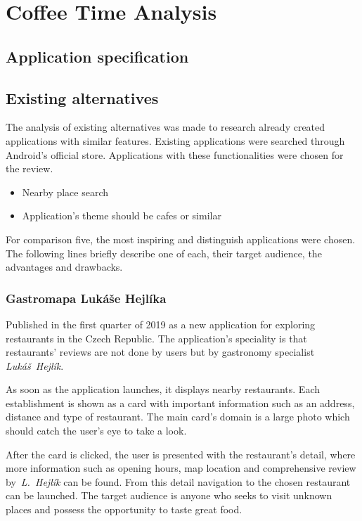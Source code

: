 \chapter{Coffee Time Analysis}


\section{Application specification}


\section{Existing alternatives}
The analysis of existing alternatives was made to research already created applications with similar features. Existing applications were searched through Android's official store. Applications with these functionalities were chosen for the review.

\begin{itemize}
    \item Nearby place search
    \item Application's theme should be cafes or similar
\end{itemize}

For comparison five, the most inspiring and distinguish applications were chosen. The following lines briefly describe one of each, their target audience, the advantages and drawbacks. 

\subsection{Gastromapa Lukáše Hejlíka}
Published in the first quarter of 2019 as a new application for exploring restaurants in the Czech Republic.  The application's speciality is that restaurants' reviews are not done by users but by gastronomy specialist \textit{Lukáš~Hejlík}.

As soon as the application launches, it displays nearby restaurants. Each establishment is shown as a card with important information such as an address, distance and type of restaurant. The main card's domain is a large photo which should catch the user's eye to take a look. 

After the card is clicked, the user is presented with the restaurant's detail, where more information such as opening hours, map location and comprehensive review by~\textit{L.~Hejlík} can be found. From this detail navigation to the chosen restaurant can be launched. The target audience is anyone who seeks to visit unknown places and possess the opportunity to taste great food.

